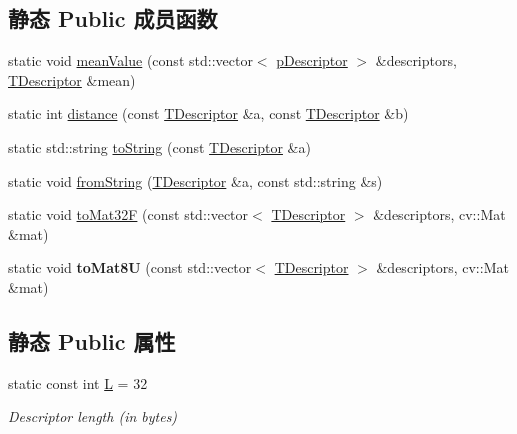 \subsection*{静态 Public 成员函数}
\begin{DoxyCompactItemize}
\item 
static void \hyperlink{classDBoW2_1_1FORB_a9d78adf3c5c6fe8f2e8668e247acf5cc}{mean\-Value} (const std\-::vector$<$ \hyperlink{classDBoW2_1_1FORB_ab52a6568044027cf30c8ac1514fed1a6}{p\-Descriptor} $>$ \&descriptors, \hyperlink{classDBoW2_1_1FORB_aef9b966d0293836fab9f55f1799ce0ed}{T\-Descriptor} \&mean)
\item 
static int \hyperlink{classDBoW2_1_1FORB_ac166ab6808abc7c385dbaabfacfed38c}{distance} (const \hyperlink{classDBoW2_1_1FORB_aef9b966d0293836fab9f55f1799ce0ed}{T\-Descriptor} \&a, const \hyperlink{classDBoW2_1_1FORB_aef9b966d0293836fab9f55f1799ce0ed}{T\-Descriptor} \&b)
\item 
static std\-::string \hyperlink{classDBoW2_1_1FORB_a3c0ce0fd04ecd52b25b97d253fb922ea}{to\-String} (const \hyperlink{classDBoW2_1_1FORB_aef9b966d0293836fab9f55f1799ce0ed}{T\-Descriptor} \&a)
\item 
static void \hyperlink{classDBoW2_1_1FORB_a4023e7775d0691b44f6708f865b6b8d7}{from\-String} (\hyperlink{classDBoW2_1_1FORB_aef9b966d0293836fab9f55f1799ce0ed}{T\-Descriptor} \&a, const std\-::string \&s)
\item 
static void \hyperlink{classDBoW2_1_1FORB_a67b90eaed01dd54e380237c78886635f}{to\-Mat32\-F} (const std\-::vector$<$ \hyperlink{classDBoW2_1_1FORB_aef9b966d0293836fab9f55f1799ce0ed}{T\-Descriptor} $>$ \&descriptors, cv\-::\-Mat \&mat)
\item 
\hypertarget{classDBoW2_1_1FORB_af0a9e2ea44336f2975a7f3324777330c}{static void {\bfseries to\-Mat8\-U} (const std\-::vector$<$ \hyperlink{classDBoW2_1_1FORB_aef9b966d0293836fab9f55f1799ce0ed}{T\-Descriptor} $>$ \&descriptors, cv\-::\-Mat \&mat)}\label{classDBoW2_1_1FORB_af0a9e2ea44336f2975a7f3324777330c}

\end{DoxyCompactItemize}
\subsection*{静态 Public 属性}
\begin{DoxyCompactItemize}
\item 
\hypertarget{classDBoW2_1_1FORB_ad6ed07af4e042effc3c0b169aa5bdd1a}{static const int \hyperlink{classDBoW2_1_1FORB_ad6ed07af4e042effc3c0b169aa5bdd1a}{L} = 32}\label{classDBoW2_1_1FORB_ad6ed07af4e042effc3c0b169aa5bdd1a}

\begin{DoxyCompactList}\small\item\em Descriptor length (in bytes) \end{DoxyCompactList}\end{DoxyCompactItemize}


